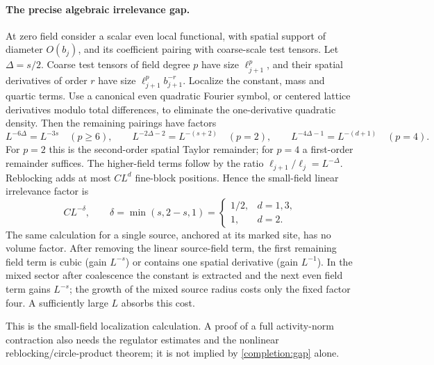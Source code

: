 \documentclass[11pt]{article}
\begin{document}
\paragraph{The precise algebraic irrelevance gap.}
At zero field consider a scalar even local functional, with spatial
support of diameter \(O(b_j)\), and its coefficient pairing with
coarse-scale test tensors. Let \(\Delta=s/2\). Coarse test tensors of
field degree \(p\) have size \(\ell_{j+1}^p\), and their spatial
derivatives of order \(r\) have size
\(\ell_{j+1}^p b_{j+1}^{-r}\). Localize the constant, mass and quartic
terms. Use a canonical even quadratic Fourier symbol, or centered
lattice derivatives modulo total differences, to eliminate the
one-derivative quadratic density. Then the remaining pairings have
factors
\[
 L^{-6\Delta}=L^{-3s}\quad(p\ge6),\qquad
 L^{-2\Delta-2}=L^{-(s+2)}\quad(p=2),\qquad
 L^{-4\Delta-1}=L^{-(d+1)}\quad(p=4).
\]
For \(p=2\) this is the second-order spatial Taylor remainder; for
\(p=4\) a first-order remainder suffices. The higher-field terms follow
by the ratio \(\ell_{j+1}/\ell_j=L^{-\Delta}\). Reblocking adds at most
\(CL^d\) fine-block positions. Hence the small-field linear
irrelevance factor is
\begin{equation}\label{completion:gap}
 CL^{-\delta},\qquad
 \delta=\min(s,2-s,1)=
 \begin{cases}1/2,&d=1,3,\\1,&d=2.\end{cases}
\end{equation}
The same calculation for a single source, anchored at its marked site,
has no volume factor. After removing the linear source-field term,
the first remaining field term is cubic (gain \(L^{-s}\)) or contains
one spatial derivative (gain \(L^{-1}\)). In the mixed sector after
coalescence the constant is extracted and the next even field term
gains \(L^{-s}\); the growth of the mixed source radius costs only the
fixed factor four. A sufficiently large \(L\) absorbs this cost.

This is the small-field localization calculation. A proof of a full
activity-norm contraction also needs the regulator estimates and the
nonlinear reblocking/circle-product theorem; it is not implied by
\eqref{completion:gap} alone.
\end{document}
